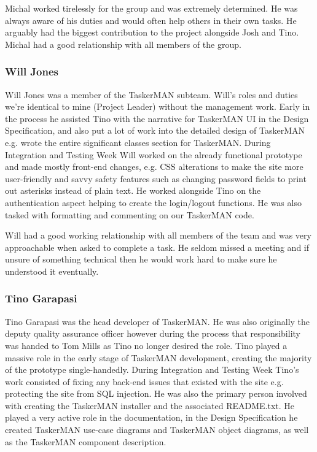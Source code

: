\documentclass{project}
\begin{document}
Michal worked tirelessly for the group and was extremely determined. He was always aware of his duties and would often help others in their own tasks. He arguably had the biggest contribution to the project alongside Josh and Tino. Michal had a good relationship with all members of the group.
\subsubsection{Will Jones}
Will Jones was a member of the TaskerMAN subteam. Will's roles and duties we're identical to mine (Project Leader) without the management work. Early in the process he assisted Tino with the narrative for TaskerMAN UI in the Design Specification\cite{se.qa.ds}, and also put a lot of work into the detailed design of TaskerMAN e.g. wrote the entire significant classes section for TaskerMAN. During Integration and Testing Week Will worked on the already functional prototype and made mostly front-end changes, e.g. CSS alterations to make the site more user-friendly and savvy safety features such as changing password fields to print out asterisks instead of plain text. He worked alongside Tino on the authentication aspect helping to create the login/logout functions. He was also tasked with formatting and commenting on our TaskerMAN code.

Will had a good working relationship with all members of the team and was very approachable when asked to complete a task. He seldom missed a meeting and if unsure of something technical then he would work hard to make sure he understood it eventually.
\subsubsection{Tino Garapasi}
Tino Garapasi was the head developer of TaskerMAN. He was also originally the deputy quality assurance officer however during the process that responsibility was handed to Tom Mills as Tino no longer desired the role. Tino played a massive role in the early stage of TaskerMAN development, creating the majority of the prototype single-handedly. During Integration and Testing Week Tino's work consisted of fixing any back-end issues that existed with the site e.g. protecting the site from SQL injection. He was also the primary person involved with creating the TaskerMAN installer and the associated README.txt. He played a very active role in the documentation,  in the Design Specification\cite{se.qa.ds} he created TaskerMAN use-case diagrams and TaskerMAN object diagrams, as well as the TaskerMAN component description.
\end{document}
